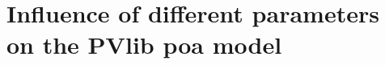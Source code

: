 











\newpage
\newpage
\newpage
\section{Influence of different parameters on the PVlib poa model}
\label{influence_parameters}



















